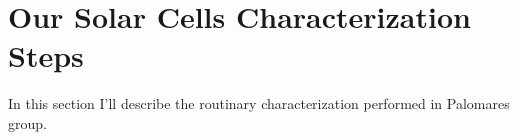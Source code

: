 %
%

\section{Our Solar Cells Characterization Steps}

	In this section I'll describe the routinary characterization performed in Palomares group.


